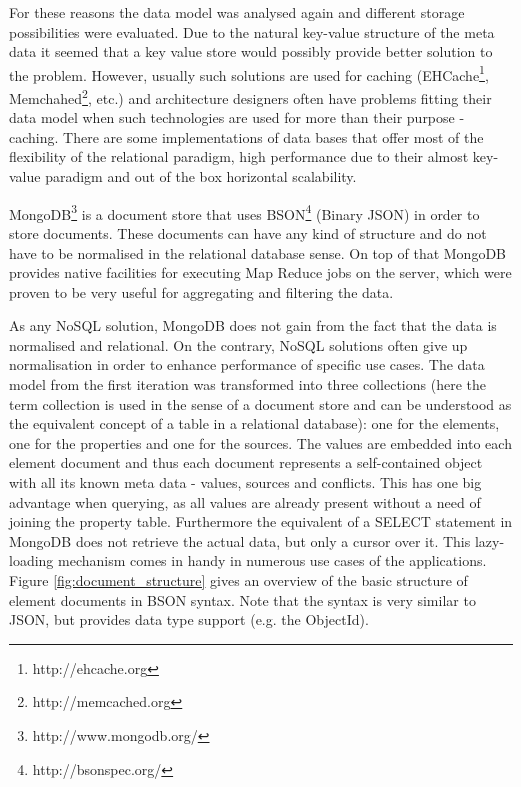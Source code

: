 For these reasons the data model was analysed again and different storage possibilities were evaluated.  Due to the natural key-value structure of the meta data it seemed that a key value store would possibly provide better solution to the problem. However, usually such solutions are used for caching (EHCache\footnote{http://ehcache.org}, Memchahed\footnote{http://memcached.org}, etc.) and architecture designers often have problems fitting their data model when such technologies are used for more than their purpose - caching. There are some implementations of data bases that offer most of the flexibility of the relational paradigm, high performance due to their almost key-value paradigm and out of the box horizontal scalability.

MongoDB\footnote{http://www.mongodb.org/} is a document store that uses BSON\footnote{http://bsonspec.org/} (Binary JSON) in order to store documents. These documents can have any kind of structure and do not have to be normalised in the relational database sense. On top of that MongoDB provides native facilities for executing Map Reduce \cite{Dean:2008:MSD:1327452.1327492} jobs on the server, which were proven to be very useful for aggregating and filtering the data. 

As any NoSQL solution, MongoDB does not gain from the fact that the data is normalised and relational. On the contrary, NoSQL solutions often give up normalisation in order to enhance performance of specific use cases. The data model from the first iteration was transformed into three collections (here the term collection is used in the sense of a document store and can be understood as the equivalent concept of a table in a relational database): one for the elements, one for the properties and one for the sources. The values are embedded into each element document and thus each document represents a self-contained object with all its known meta data - values, sources and conflicts. This has one big advantage when querying, as all values are already present without a need of joining the property table. Furthermore the equivalent of a SELECT statement in MongoDB does not retrieve the actual data, but only a cursor over it. This lazy-loading mechanism comes in handy in numerous use cases of the applications.
Figure \ref{fig:document_structure} gives an overview of the basic structure of element documents in BSON syntax. Note that the syntax is very similar to JSON, but provides data type support (e.g. the ObjectId).

